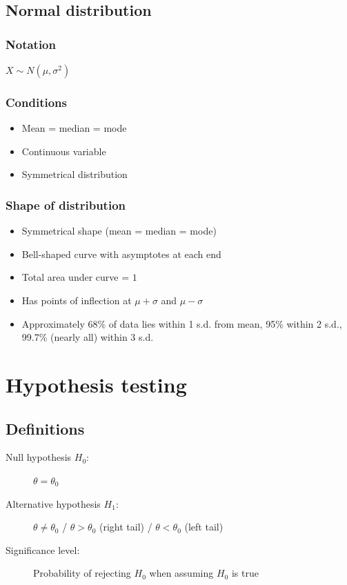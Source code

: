 \documentclass[A4paper, 11pt]{article}
\begin{document}
	\subsection{Normal distribution}
	\subsubsection{Notation}
	$X \sim N(\mu,\sigma^2)$
	\subsubsection{Conditions}
	\begin{itemize}
		\item Mean = median = mode
		\item Continuous variable
		\item Symmetrical distribution
	\end{itemize}
	\subsubsection{Shape of distribution}
	\begin{itemize}
		\item Symmetrical shape (mean = median = mode)
		\item Bell-shaped curve with asymptotes at each end
		\item Total area under curve = $1$
		\item Has points of inflection at $\mu+\sigma$ and $\mu-\sigma$
		\item Approximately 68\% of data lies within 1 s.d. from mean, 95\% within 2 s.d., 99.7\% (nearly all) within 3 s.d.
	\end{itemize}
	
	\pagebreak
	
	
	\section{Hypothesis testing}
	\subsection{Definitions}
	\begin{description}
		\item[Null hypothesis $H_0$:] $\theta=\theta_0$
		\item[Alternative hypothesis $H_1$:] $\theta \neq \theta_0$ / $\theta>\theta_0$ (right tail) / $\theta<\theta_0$ (left tail)
		\item[Significance level:] Probability of rejecting $H_0$ when assuming $H_0$ is true
	\end{description}
\end{document}
